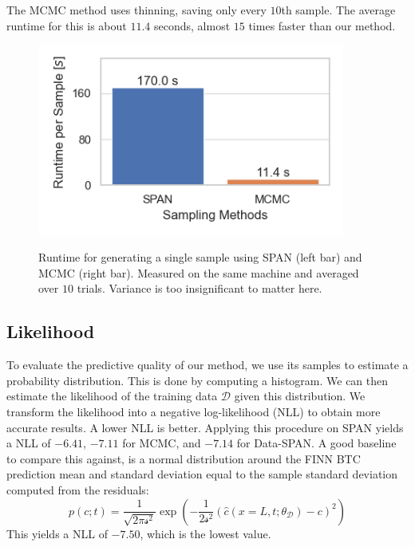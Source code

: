 \documentclass{article}
\begin{document}
The MCMC method uses thinning, saving only every $10$th sample. The average runtime for this is about $11.4$ seconds, almost $15$ times faster than our method.



\begin{figure}
    \centering
    \includegraphics[width=0.9\textwidth]{figs/runtime_per_sample.png}
    \label{fig:runtime_per_sample}
    \caption{Runtime for generating a single sample using SPAN (left bar) and MCMC (right bar). Measured on the same machine and averaged over $10$ trials. Variance is too insignificant to matter here.}
\end{figure}

\subsection{Likelihood}
To evaluate the predictive quality of our method, we use its samples to estimate a probability distribution. This is done by computing a histogram. We can then estimate the likelihood of the training data $\mathcal{D}$ given this distribution. We transform the likelihood into a negative log-likelihood (NLL) to obtain more accurate results. A lower NLL is better. Applying this procedure on SPAN yields a NLL of $-6.41$, $-7.11$ for MCMC, and $-7.14$ for Data-SPAN. A good baseline to compare this against, is a normal distribution around the FINN BTC prediction mean and standard deviation equal to the sample standard deviation computed from the residuals:
\begin{equation*}
    p(c; t) = \frac{1}{\sqrt{2 \pi \mathcal{s}^2}} \exp(-\frac{1}{2 \mathcal{s}^2} (\hat{c}(x=L, t; \theta_{\mathcal{D}}) - c)^2)
\end{equation*}
This yields a NLL of $-7.50$, which is the lowest value. %
\end{document}
